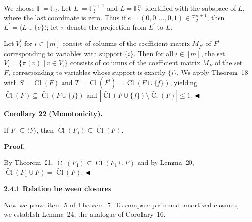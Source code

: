 \documentclass[10pt,a4paper]{article}
\begin{document}
We choose $\mathbb{F}=\mathbb{F}_{2}$. Let $L^{\prime}=\mathbb{F}_{2}^{n+1}$ and $L=\mathbb{F}_{2}^{n}$, identified with the subspace of
$L$, where the last coordinate is zero. Thus if $e=(0,0,\dots,0,1)\in\mathbb{F}_{2}^{n+1}$, then $L^{\prime}=\langle L\cup\{e\}\rangle$; let $\pi$ denote the projection from $L^{\prime}$ to $L$.\par



Let $V^{\prime}_{i}$ for $i\in[m]$ consist of columns of the coefficient matrix $M_{F^{\prime}}$ of $F^{\prime}$ corresponding to variables with support $\{i\}$. Then for all $i\in[m]$, the set $V_{i}=\{\pi(v)\mid v\in V_{i}^{\prime}\}$ consists of columns of the coefficient matrix $M_{F}$ of the set $F$, corresponding to variables whose support is exactly $\{i\}$. We apply Theorem 18 with $S=\widetilde{\mathop{\mathrm{Cl}}}(F)$ and $T=\widetilde{\mathop{\mathrm{Cl}}}(F^{\prime})=\widetilde{\mathop{\mathrm{Cl}}}(F\cup\{f\})$, yielding $\widetilde{\mathop{\mathrm{Cl}}}(F)\subseteq\widetilde{\mathop{\mathrm{Cl}}}(F\cup\{f\})$ and $|\widetilde{\mathop{\mathrm{Cl}}}(F\cup\{f\})\setminus\widetilde{\mathop{\mathrm{Cl}}}(F)|\leq 1$.
$\hfill\blacktriangleleft$\par



\par\medskip\noindent\textbf{
Corollary 22 (Monotonicity).
}\par



If $F_{1}\subseteq\langle F\rangle$, then $\widetilde{\mathop{\mathrm{Cl}}}(F_{1})\subseteq\widetilde{\mathop{\mathrm{Cl}}}(F)$.\par



\par\medskip\noindent\textbf{Proof.}\par


By Theorem 21, $\widetilde{\mathop{\mathrm{Cl}}}(F_{1})\subseteq\widetilde{\mathop{\mathrm{Cl}}}(F_{1}\cup F)$ and by Lemma 20, $\widetilde{\mathop{\mathrm{Cl}}}(F_{1}\cup F)=\widetilde{\mathop{\mathrm{Cl}}}(F)$.
$\hfill\blacktriangleleft$\par


\par\medskip\noindent\textbf{
2.4.1 Relation between closures}\par


Now we prove item 5 of Theorem 7. To compare plain and amortized closures, we establish Lemma 24, the analogue of Corollary 16.\par
\end{document}
